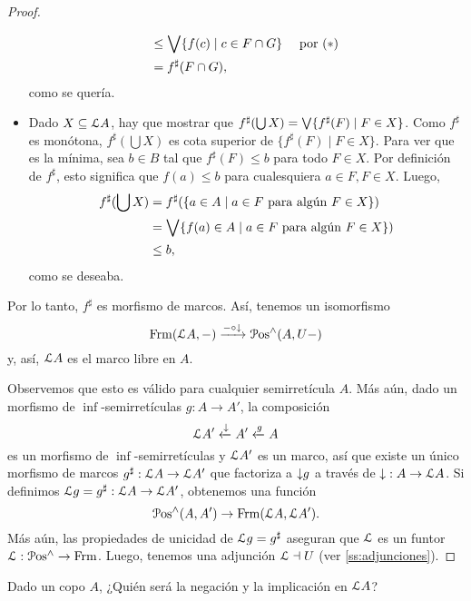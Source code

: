 \begin{proof}
\begin{itemize}
\begin{align*}
            &\leq \Sup\{f(c) \mid c\in F\cap G\}
                && \text{ por $(*)$ } \\
            &= f^\sharp(F\cap G),
        \end{align*}
        como se quería.
        \item
        Dado $X\subseteq \cal LA$, hay que mostrar que
        $f^\sharp(\bigcup X)=\Sup\{f^\sharp(F) \mid F\in X\}$.
        Como $f^\sharp$ es monótona,
        $f^\sharp(\bigcup X)$ es cota superior de
        $\{f^\sharp(F) \mid F\in X\}$.
        Para ver que es la mínima, sea $b\in B$ tal que
        $f^\sharp(F)\leq b$ para todo $F\in X$.
        Por definición de $f^\sharp$, esto significa que
        $f(a)\leq b$ para cualesquiera $a\in F, F\in X$.
        Luego,
        \begin{align*}
            f^\sharp(\bigcup X)
            &= f^\sharp (
            \{a\in A \mid a\in F\text{ para algún }F\in X\}
            ) \\
            &=
            \Sup\{f(a)\in A \mid a\in F\text{ para algún }F\in X\}) \\
            &\leq b,
        \end{align*}
        como se deseaba.
    \end{itemize}
    Por lo tanto, $f^\sharp$ es morfismo de marcos.
    Así, tenemos un isomorfismo
    \[
        \Frm(\cal LA,-)\xto{-\circ \down} \Pos^{\inf}(A,U-)
    \]
    y, así, $\cal LA$ es el marco libre en $A$.
    
    Observemos que esto es válido para cualquier
    semirretícula $A$.
    Más aún, dado un morfismo de $\inf$-semirretículas
    $g:A\to A'$, la composición
    \[
        \cal LA' \lar \down A' \lar g A
    \]
    es un morfismo de $\inf$-semirretículas y
    $\cal LA'$ es un marco, así que
    existe un único morfismo de marcos
    $g^\sharp:\cal LA\to \cal LA'$ que factoriza a
    $\down g$ a través de $\down:A\to \cal LA$.
    Si definimos $\cal Lg=g^\sharp:\cal LA\to\cal LA'$,
    obtenemos una función
    \[
        \Pos^{\inf}(A,A') \to \Frm(\cal LA,\cal LA')
    .\]
    Más aún, las propiedades de unicidad de
    $\cal Lg=g^\sharp$ aseguran que $\cal L$ es un funtor
    $\cal L:\Pos^{\inf}\to\Frm$.
    Luego, tenemos una adjunción $\cal L\dashv U$
    (ver \ref{ss:adjunciones}).
\end{proof}

\begin{exercise}%
  Dado un copo $A$,
  ¿Quién será la negación y la implicación en $\cal LA$?
\end{exercise}


